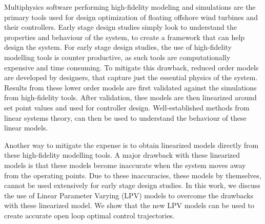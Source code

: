 Multiphysics software performing high-fidelity modeling and simulations are the primary tools used for design optimization of floating offshore wind turbines and their controllers.
Early stage design studies simply look to understand the properties and  behaviour of the system, to create a framework that can help design the system. 
For early stage design studies, the use of high-fidelity modelling tools is counter productive, as such tools are computationally expensive and time consuming.
To mitigate this drawback, reduced order models are developed by designers, that capture just the essential physics of the system. 
Results from these lower order models are first validated against the simulations from high-fidelity tools.
After validation, thee models are then linearized around set point values and used for controller design.
Well-established methods from linear systems theory, can then be used to understand the behaviour of these linear models.

Another way to mitigate the expense is to obtain linearized models directly from these high-fidelity modelling tools. 
A major drawback with these linearized models is that these models become inaccurate when the system moves away from the operating points.
Due to these inaccuracies, these models by themselves, cannot be used extensively for early stage design studies.
In this work, we discuss the use of Linear Parameter Varying (LPV) models to overcome the drawbacks with these linearized model.
We show that the new LPV models can be used to create accurate open loop optimal control trajectories.
